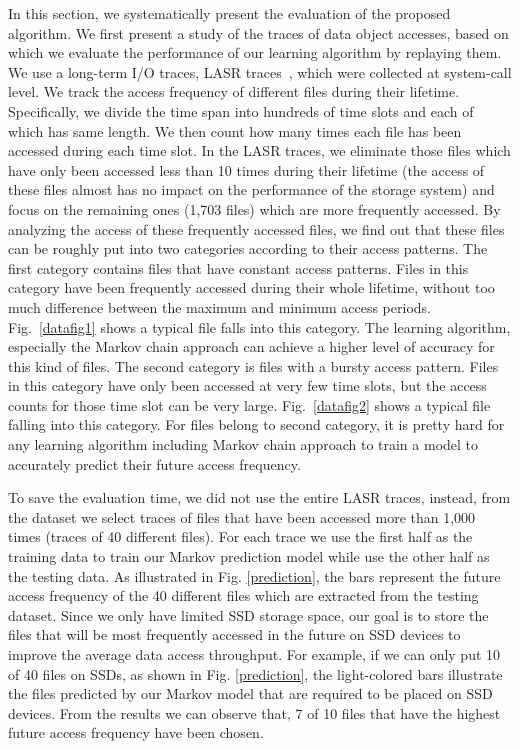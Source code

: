 In this section, we systematically present the evaluation of the proposed algorithm. We first present a study of the traces of data object accesses, based on which we evaluate the performance of our learning algorithm by replaying them. We use a long-term I/O traces, LASR traces~\cite{tracedata2}, which were collected at system-call level. We track the access frequency of different files during their lifetime. Specifically, we divide the time span into hundreds of time slots and each of which has same length. We then count how many times each file has been accessed during each time slot. In the LASR traces, we eliminate those files which have only been accessed less than 10 times during their lifetime (the access of these files almost has no impact on the performance of the storage system) and focus on the remaining ones (1,703 files) which are more frequently accessed. By analyzing the access of these frequently accessed files, we find out that these files can be roughly put into two categories according to their access patterns. The first category contains files that have constant access patterns. Files in this category have been frequently accessed during their whole lifetime, without too much difference between the maximum and minimum access periods. Fig.~\ref{datafig1} shows a typical file falls into this category. The learning algorithm, especially the Markov chain approach can achieve a higher level of accuracy for this kind of files. The second category is files with a bursty access pattern. Files in this category have only been accessed at very few time slots, but the access counts for those time slot can be very large. Fig.~\ref{datafig2} shows a typical file falling into this category. For files belong to second category, it is pretty hard for any learning algorithm including Markov chain approach to train a model to accurately predict their future access frequency.


To save the evaluation time, we did not use the entire LASR traces, instead, from the dataset we select traces of files that have been accessed more than 1,000 times (traces of 40 different files). For each trace we use the first half as the training data to train our Markov prediction model while use the other half as the testing data. As illustrated in Fig. \ref{prediction}, the bars represent the future access frequency of the 40 different files which are extracted from the testing dataset. Since we only have limited SSD storage space, our goal is to store the files that will be most frequently accessed in the future on SSD devices to improve the average data access throughput. For example, if we can only put 10 of 40 files on SSDs, as shown in Fig. \ref{prediction}, the light-colored bars illustrate the files predicted by our Markov model that are required to be placed on SSD devices. From the results we can observe that, 7 of 10 files that have the highest future access frequency have been chosen.

